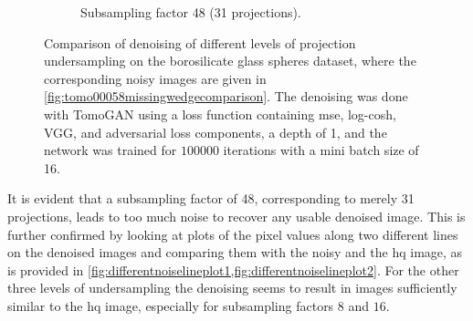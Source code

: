 \begin{figure}
\begin{subfigure}[t]{.45\textwidth}
    \caption{Subsampling factor 48 (31 projections). }
  \end{subfigure}
  \caption[Denoising of four different levels of projection undersampling  on the borosilicate glass spheres dataset]{Comparison of denoising of different levels of projection undersampling on the borosilicate glass spheres dataset, where the corresponding noisy images are given in \cref{fig:tomo00058missingwedgecomparison}. The denoising was done with TomoGAN using a loss function containing \gls{mse}, log-cosh, VGG, and adversarial loss components, a depth of 1, and the network was trained for $100 000$ iterations with a mini batch size of 16. }
  \label{fig:tomo00058missingwedgecomparisondenoised}
\end{figure}

It is evident that a subsampling factor of 48, corresponding to merely 31 projections, leads to too much noise to recover any usable denoised image. This is further confirmed by looking at plots of the pixel values along two different lines on the denoised images and comparing them with the noisy and the \gls{hq} image, as is provided in \cref{fig:differentnoiselineplot1,fig:differentnoiselineplot2}. For the other three levels of undersampling the denoising seems to result in images sufficiently similar to the \gls{hq} image, especially for subsampling factors $8$ and $16$. 

